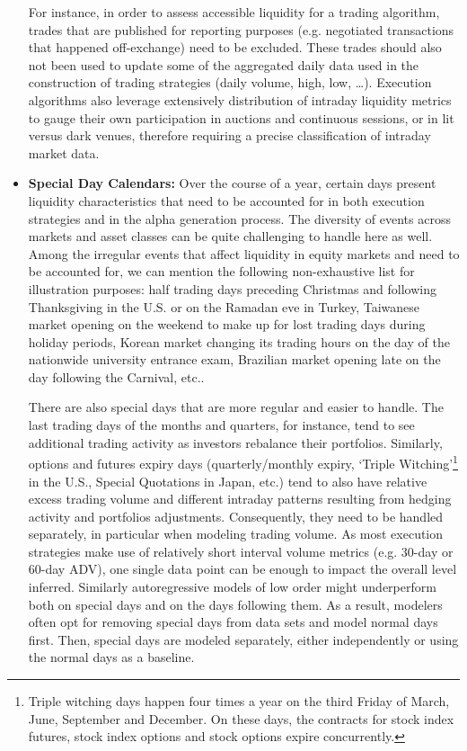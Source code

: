 \begin{itemize}
For instance, in order to assess accessible liquidity for a trading algorithm, trades that are published for reporting purposes (e.g. negotiated transactions that happened off-exchange) need to be excluded. These trades should also not been used to update some of the aggregated daily data used in the construction of trading strategies (daily volume, high, low, \dots). Execution algorithms also leverage extensively distribution of intraday liquidity metrics to gauge their own participation in auctions and continuous sessions, or in lit versus dark venues, therefore requiring a precise classification of intraday market data. 


\item \textbf{Special Day Calendars:} Over the course of a year, certain days present liquidity characteristics that need to be accounted for in both execution strategies and in the alpha generation process. The diversity of events across markets and asset classes can be quite challenging to handle here as well. Among the irregular events that affect liquidity in equity markets and need to be accounted for, we can mention the following non-exhaustive list for illustration purposes: half trading days preceding Christmas and following Thanksgiving in the U.S. or on the Ramadan eve in Turkey, Taiwanese market opening on the weekend to make up for lost trading days during holiday periods, Korean market changing its trading hours on the day of the nationwide university entrance exam, Brazilian market opening late on the day following the Carnival, etc..


There are also special days that are more regular and easier to handle. The last trading days of the months and quarters, for instance, tend to see additional trading activity as investors rebalance their portfolios. Similarly, options and futures expiry days (quarterly/monthly expiry, `Triple Witching'\footnote{Triple witching days happen four times a year on the third Friday of March, June, September and December. On these days, the contracts for stock index futures, stock index options and stock options expire concurrently.} in the U.S., Special Quotations in Japan, etc.) tend to also have relative excess trading volume and different intraday patterns resulting from hedging activity and portfolios adjustments. Consequently, they need to be handled separately, in particular when modeling trading volume. As most execution strategies make use of relatively short interval volume metrics (e.g. 30-day or 60-day ADV), one single data point can be enough to impact the overall level inferred. Similarly autoregressive models of low order might underperform both on special days and on the days following them. As a result, modelers often opt for removing special days from data sets and model normal days first. Then, special days are modeled separately, either independently or using the normal days as a baseline. 



\end{itemize}
